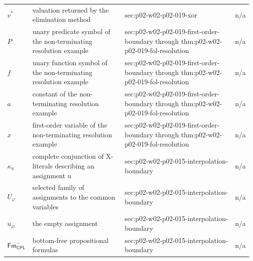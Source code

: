\begin{longtable}{@{}p{}p{}p{}p{}@{}}
\(v^{*}\) & valuation returned by the elimination method & sec:\allowbreak{}p02-\allowbreak{}w02-\allowbreak{}p02-\allowbreak{}019-\allowbreak{}xor & n/a \\
\(P\) & unary predicate symbol of the non-terminating resolution example & sec:\allowbreak{}p02-\allowbreak{}w02-\allowbreak{}p02-\allowbreak{}019-\allowbreak{}first-\allowbreak{}order-\allowbreak{}boundary through thm:\allowbreak{}p02-\allowbreak{}w02-\allowbreak{}p02-\allowbreak{}019-\allowbreak{}fol-\allowbreak{}resolution & n/a \\
\(f\) & unary function symbol of the non-terminating resolution example & sec:\allowbreak{}p02-\allowbreak{}w02-\allowbreak{}p02-\allowbreak{}019-\allowbreak{}first-\allowbreak{}order-\allowbreak{}boundary through thm:\allowbreak{}p02-\allowbreak{}w02-\allowbreak{}p02-\allowbreak{}019-\allowbreak{}fol-\allowbreak{}resolution & n/a \\
\(a\) & constant of the non-terminating resolution example & sec:\allowbreak{}p02-\allowbreak{}w02-\allowbreak{}p02-\allowbreak{}019-\allowbreak{}first-\allowbreak{}order-\allowbreak{}boundary through thm:\allowbreak{}p02-\allowbreak{}w02-\allowbreak{}p02-\allowbreak{}019-\allowbreak{}fol-\allowbreak{}resolution & n/a \\
\(x\) & first-order variable of the non-terminating resolution example & sec:\allowbreak{}p02-\allowbreak{}w02-\allowbreak{}p02-\allowbreak{}019-\allowbreak{}first-\allowbreak{}order-\allowbreak{}boundary through thm:\allowbreak{}p02-\allowbreak{}w02-\allowbreak{}p02-\allowbreak{}019-\allowbreak{}fol-\allowbreak{}resolution & n/a \\
\(\kappa_u\) & complete conjunction of X-literals describing an assignment u & sec:\allowbreak{}p02-\allowbreak{}w02-\allowbreak{}p02-\allowbreak{}015-\allowbreak{}interpolation-\allowbreak{}boundary & n/a \\
\(U_\varphi\) & selected family of assignments to the common variables & sec:\allowbreak{}p02-\allowbreak{}w02-\allowbreak{}p02-\allowbreak{}015-\allowbreak{}interpolation-\allowbreak{}boundary & n/a \\
\(u_\varnothing\) & the empty assignment & sec:\allowbreak{}p02-\allowbreak{}w02-\allowbreak{}p02-\allowbreak{}015-\allowbreak{}interpolation-\allowbreak{}boundary & n/a \\
\(\mathsf{Fm}_{\mathsf{CPL}}^{-}\) & bottom-free propositional formulas & sec:\allowbreak{}p02-\allowbreak{}w02-\allowbreak{}p02-\allowbreak{}015-\allowbreak{}interpolation-\allowbreak{}boundary & n/a \\

\end{longtable}
